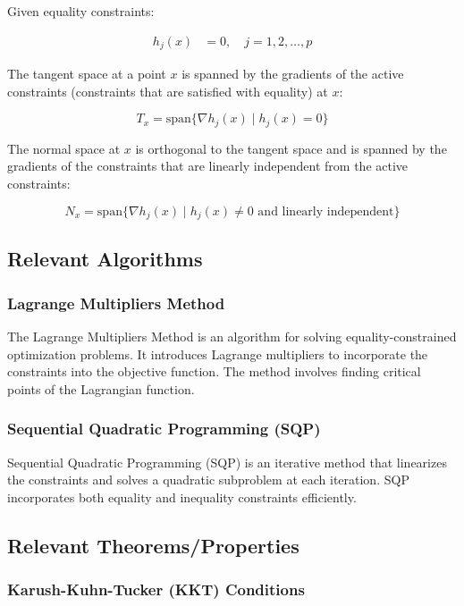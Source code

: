 \documentclass[a4paper]{article}
\begin{document}
Given equality constraints:

\begin{align*}
h_j(x) &= 0, \quad j = 1, 2, \ldots, p
\end{align*}


The tangent space at a point \(x\) is spanned by the gradients of the active constraints (constraints that are satisfied with equality) at \(x\):

\[
T_x = \text{span}\{\nabla h_j(x) \mid h_j(x) = 0\}
\]

The normal space at \(x\) is orthogonal to the tangent space and is spanned by the gradients of the constraints that are linearly independent from the active constraints:

\[
N_x = \text{span}\{\nabla h_j(x) \mid h_j(x) \neq 0\text{ and linearly independent}\}
\]

\subsection{Relevant Algorithms}

\subsubsection{Lagrange Multipliers Method}

The Lagrange Multipliers Method is an algorithm for solving equality-constrained optimization problems. It introduces Lagrange multipliers to incorporate the constraints into the objective function. The method involves finding critical points of the Lagrangian function.

\subsubsection{Sequential Quadratic Programming (SQP)}

Sequential Quadratic Programming (SQP) is an iterative method that linearizes the constraints and solves a quadratic subproblem at each iteration. SQP incorporates both equality and inequality constraints efficiently.

\subsection{Relevant Theorems/Properties}

\subsubsection{Karush-Kuhn-Tucker (KKT) Conditions}
\end{document}
